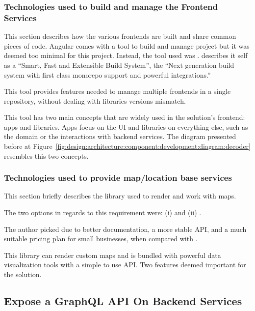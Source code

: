 \subsubsection{Technologies used to build and manage the Frontend Services}
\label{subsubsec:implementation:decisions:frontend:nx}

This section describes how the various frontends are built and share common pieces of code. Angular comes with a tool to build and manage project but it was deemed too minimal for this project. Instead, the tool used was .  describes it self as a ``Smart, Fast and Extensible Build System'', the
``Next generation build system with first class monorepo support and powerful integrations.''

This tool provides features needed to manage multiple frontends in a single repository, without dealing with libraries versions mismatch.

This tool has two main concepts that are widely used in the solution's frontend: apps and libraries. Apps focus on the \gls{UI} and libraries on everything else, such as the domain or the interactions with backend services. The diagram presented before at Figure~\ref{fig:design:architecture:component:development:diagram:decoder} resembles this two concepts.

\subsubsection{Technologies used to provide map/location base services}
\label{subsubsec:implementation:decisions:frontend:maps}

This section briefly describes the library used to render and work with maps.

The two options in regards to this requirement were: (i)  and (ii) .

The author picked  due to better documentation, a more stable \gls{API}, and a much suitable pricing plan for small businesses, when compared with .

This library can render custom maps and is bundled with powerful data visualization tools with a simple to use \gls{API}. Two features deemed important for the solution.

\subsection{Expose a GraphQL API On Backend Services}
\label{subsec:implementation:decisions:graphql}

